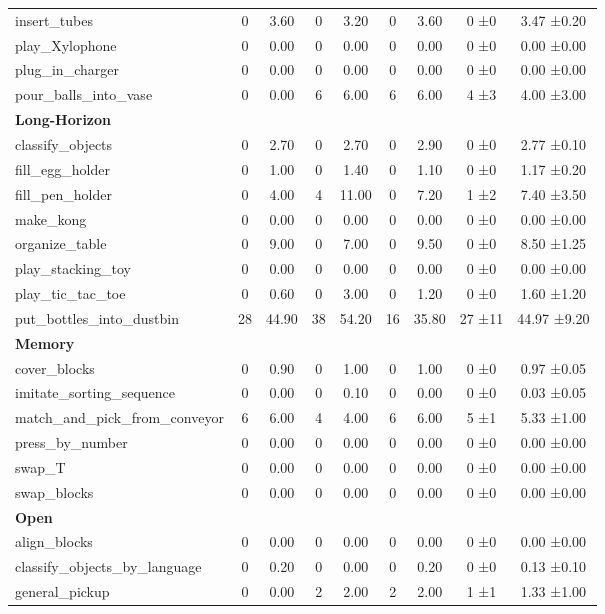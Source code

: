 \begin{table}[H]
{\begin{tabular}{l|c|c|c|c|c|c|c|c}
insert\_tubes & 0 & 3.60 & 0 & 3.20 & 0 & 3.60 & 0 ±0 & 3.47 ±0.20 \\
play\_Xylophone & 0 & 0.00 & 0 & 0.00 & 0 & 0.00 & 0 ±0 & 0.00 ±0.00 \\
plug\_in\_charger & 0 & 0.00 & 0 & 0.00 & 0 & 0.00 & 0 ±0 & 0.00 ±0.00 \\
pour\_balls\_into\_vase & 0 & 0.00 & 6 & 6.00 & 6 & 6.00 & 4 ±3 & 4.00 ±3.00 \\
\hline
\multicolumn{9}{l}{\textbf{Long-Horizon}} \\
classify\_objects & 0 & 2.70 & 0 & 2.70 & 0 & 2.90 & 0 ±0 & 2.77 ±0.10 \\
fill\_egg\_holder & 0 & 1.00 & 0 & 1.40 & 0 & 1.10 & 0 ±0 & 1.17 ±0.20 \\
fill\_pen\_holder & 0 & 4.00 & 4 & 11.00 & 0 & 7.20 & 1 ±2 & 7.40 ±3.50 \\
make\_kong & 0 & 0.00 & 0 & 0.00 & 0 & 0.00 & 0 ±0 & 0.00 ±0.00 \\
organize\_table & 0 & 9.00 & 0 & 7.00 & 0 & 9.50 & 0 ±0 & 8.50 ±1.25 \\
play\_stacking\_toy & 0 & 0.00 & 0 & 0.00 & 0 & 0.00 & 0 ±0 & 0.00 ±0.00 \\
play\_tic\_tac\_toe & 0 & 0.60 & 0 & 3.00 & 0 & 1.20 & 0 ±0 & 1.60 ±1.20 \\
put\_bottles\_into\_dustbin & 28 & 44.90 & 38 & 54.20 & 16 & 35.80 & 27 ±11 & 44.97 ±9.20 \\
\hline
\multicolumn{9}{l}{\textbf{Memory}} \\
cover\_blocks & 0 & 0.90 & 0 & 1.00 & 0 & 1.00 & 0 ±0 & 0.97 ±0.05 \\
imitate\_sorting\_sequence & 0 & 0.00 & 0 & 0.10 & 0 & 0.00 & 0 ±0 & 0.03 ±0.05 \\
match\_and\_pick\_from\_conveyor & 6 & 6.00 & 4 & 4.00 & 6 & 6.00 & 5 ±1 & 5.33 ±1.00 \\
press\_by\_number & 0 & 0.00 & 0 & 0.00 & 0 & 0.00 & 0 ±0 & 0.00 ±0.00 \\
swap\_T & 0 & 0.00 & 0 & 0.00 & 0 & 0.00 & 0 ±0 & 0.00 ±0.00 \\
swap\_blocks & 0 & 0.00 & 0 & 0.00 & 0 & 0.00 & 0 ±0 & 0.00 ±0.00 \\
\hline
\multicolumn{9}{l}{\textbf{Open}} \\
align\_blocks & 0 & 0.00 & 0 & 0.00 & 0 & 0.00 & 0 ±0 & 0.00 ±0.00 \\
classify\_objects\_by\_language & 0 & 0.20 & 0 & 0.00 & 0 & 0.20 & 0 ±0 & 0.13 ±0.10 \\
general\_pickup & 0 & 0.00 & 2 & 2.00 & 2 & 2.00 & 1 ±1 & 1.33 ±1.00 \\

\end{tabular}}
\end{table}
